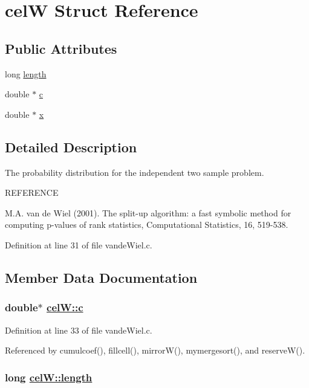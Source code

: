 \hypertarget{structcelW}{
\section{cel\-W Struct Reference}
\label{structcelW}
}
\subsection*{Public Attributes}
\begin{CompactItemize}
\item 
long \hyperlink{structcelW_47b173a5f8c56a051237cac49ddbef4f}{length}
\item 
double $\ast$ \hyperlink{structcelW_f8a631c01b9310cf542171f4df975499}{c}
\item 
double $\ast$ \hyperlink{structcelW_b443b2a7120f170c2c5e8012f4dd86d7}{x}
\end{CompactItemize}


\subsection{Detailed Description}
The probability distribution for the independent two sample problem.

REFERENCE

M.A. van de Wiel (2001). The split-up algorithm: a fast symbolic method for computing p-values of rank statistics, Computational Statistics, 16, 519-538. 



Definition at line 31 of file vande\-Wiel.c.

\subsection{Member Data Documentation}
\hypertarget{structcelW_f8a631c01b9310cf542171f4df975499}{
\subsubsection[c]{\setlength{\rightskip}{0pt plus 5cm}double$\ast$ \hyperlink{structcelW_f8a631c01b9310cf542171f4df975499}{cel\-W::c}}}
\label{structcelW_f8a631c01b9310cf542171f4df975499}




Definition at line 33 of file vande\-Wiel.c.

Referenced by cumulcoef(), fillcell(), mirror\-W(), mymergesort(), and reserve\-W().\hypertarget{structcelW_47b173a5f8c56a051237cac49ddbef4f}{
\subsubsection[length]{\setlength{\rightskip}{0pt plus 5cm}long \hyperlink{structcelW_47b173a5f8c56a051237cac49ddbef4f}{cel\-W::length}}}
\label{structcelW_47b173a5f8c56a051237cac49ddbef4f}




